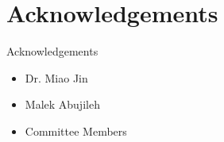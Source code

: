 \section{Acknowledgements}

\begin{frame}[t]{Acknowledgements}

	\begin{itemize}
		\item Dr. Miao Jin
		\item Malek Abujileh
		\item Committee Members
	\end{itemize}

\end{frame}